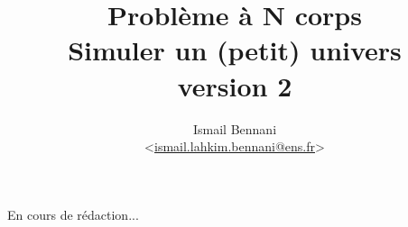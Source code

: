 \documentclass{article}
\title{\textbf{Problème à N corps} \\
       \Large Simuler un (petit) univers\\
       \small version 2}
\author{Ismail Bennani \\
        <\href{mailto:ismail.lahkim.bennani@ens.fr}{ismail.lahkim.bennani@ens.fr}>}
\date{}
\begin{document}
\maketitle

En cours de rédaction...
\end{document}
